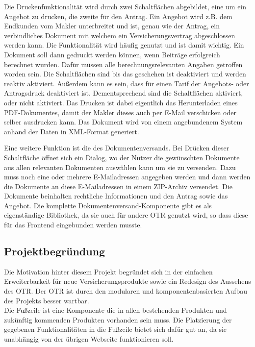 Die Druckenfunktionalität wird durch zwei Schaltflächen abgebildet, eine um ein Angebot zu drucken, die zweite für den Antrag. Ein Angebot wird z.B. dem Endkunden vom Makler unterbreitet und ist, genau wie der Antrag, ein verbindliches Dokument mit welchem ein Versicherungsvertrag abgeschlossen werden kann. Die Funktionalität wird häufig genutzt und ist damit wichtig. Ein Dokument soll dann gedruckt werden können, wenn Beiträge erfolgreich berechnet wurden. Dafür müssen alle berechnungsrelevanten Angaben getroffen worden sein.
Die Schaltflächen sind bis das geschehen ist deaktiviert und werden reaktiv aktiviert. Außerdem kann es sein, dass für einen Tarif der Angebots- oder Antragsdruck deaktiviert ist. Dementsprechend sind die Schaltflächen aktiviert, oder nicht aktiviert.  Das Drucken ist dabei eigentlich das Herunterladen eines PDF-Dokumentes, damit der Makler dieses auch per E-Mail verschicken oder selber ausdrucken kann. Das Dokument wird von einem angebundenem System anhand der Daten in XML-Format generiert.

Eine weitere Funktion ist die des Dokumentenversands. Bei Drücken dieser Schaltfläche öffnet sich ein Dialog, wo der Nutzer die gewünschten Dokumente aus allen relevanten Dokumenten auswählen kann um sie zu versenden. Dazu muss noch eine oder mehrere E-Mailadressen angegeben werden und dann werden die Dokumente an diese E-Mailadressen in einem ZIP-Archiv versendet. Die Dokumente beinhalten rechtliche Informationen und den Antrag sowie das Angebot. Die komplette Dokumentenversand-Komponente gibt es als eigenständige Bibliothek, da sie auch für andere \ac{OTR} genutzt wird, so dass diese für das Frontend eingebunden werden musste.

\subsection{Projektbegründung}
\label{projektbegründung}
Die Motivation hinter diesem Projekt begründet sich in der einfachen Erweiterbarkeit für neue Versicherungsprodukte sowie ein Redesign des Aussehens des \ac{OTR}. Der \ac{OTR} ist durch den modularen und komponentenbasierten Aufbau des Projekts besser wartbar. \\
Die Fußzeile ist eine Komponente die in allen bestehenden Produkten und zukünftig kommenden Produkten vorhanden sein muss. Die Platzierung der gegebenen Funktionalitäten in die Fußzeile bietet sich dafür gut an, da sie unabhängig von der übrigen Webseite funktionieren soll.
